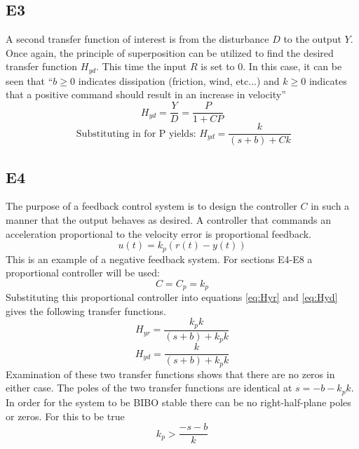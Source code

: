 \documentclass[11pt,titlepage]{article}
\begin{document}
	\subsection*{E3}
		A second transfer function of interest is from the disturbance $D$ to the output $Y$. Once again, the principle of superposition can be utilized to find the desired transfer function $H_{yd}$. This time the input $R$ is set to 0. In this case, it can be seen that ``$b\geq 0$ indicates dissipation (friction, wind, etc...) and $k\geq 0$ indicates that a positive command should result in an increase in velocity''
		\begin{equation}
			H_{yd}=\frac{Y}{D}=\frac{P}{1+CP}
		\end{equation}
		\begin{equation} \label{eq:Hyd}
			\mbox{ Substituting in for P yields: } H_{yd}=\frac{k}{(s+b)+Ck}
		\end{equation}

	\subsection*{E4}
		The purpose of a feedback control system is to design the controller $C$ in such a manner that the output behaves as desired. A controller that commands an acceleration proportional to the velocity error is proportional feedback. $$u(t)=k_p(r(t)-y(t))$$ This is an example of a negative feedback system. For sections E4-E8 a proportional controller will be used: $$C=C_p=k_p$$ Substituting this proportional controller into equations \ref{eq:Hyr} and \ref{eq:Hyd} gives the following transfer functions.
		\begin{equation} \label{eq:propHyr}
			 H_{yr}=\frac{k_pk}{(s+b)+k_pk}
		\end{equation}
		\begin{equation} \label{eq:propHyd}
			H_{yd}=\frac{k}{(s+b)+k_pk}
		\end{equation}
		Examination of these two transfer functions shows that there are no zeros in either case. The poles of the two transfer functions are identical at $s=-b-k_pk$. In order for the system to be BIBO stable there can be no right-half-plane poles or zeros. For this to be true $$k_p>\frac{-s-b}{k}$$
\end{document}
